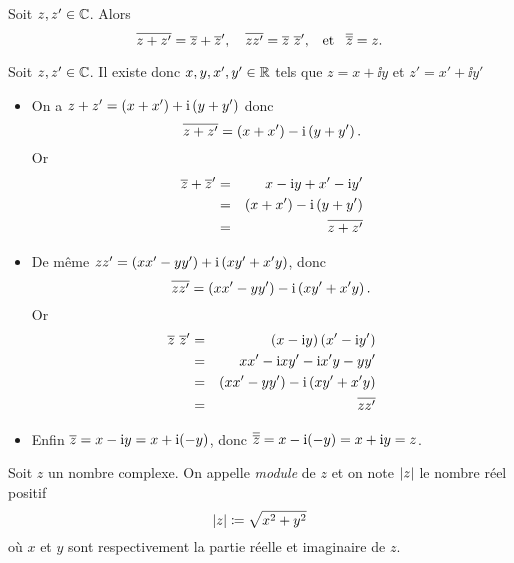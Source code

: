 \documentclass{magnolia}
\begin{document}
\begin{proposition}[utile=-3]
  Soit $z,z'\in\mathbb{C}$. Alors
 \[\overline{z+z'}=\overline{z}+\overline{z}', \quad \overline{z z'}=\overline{z}\ \overline{z}', \quad\!\text{et}\quad\! \overline{\overline{z}}=z.\]
\end{proposition}
\begin{preuve} Soit $z,z'\in\mathbb{C}$. Il existe donc $x,y,x',y'\in\mathbb{R}$ tels que
    $z=x+\ii y$ et $z'=x'+\ii y'$
  \begin{itemize}
  \item On a $z+z'=\left(x+x'\right)+{\rm i} \left(y+y'\right)$ donc
    \[\overline{z+z'}=\left(x+x'\right)-{\rm i} \left(y+y'\right).\] Or
    \begin{eqnarray*}
    \overline{z}+\overline{z}'
    &=& x-{\rm i} y+x'-{\rm i} y'\\
    &=& \left(x+x'\right)-{\rm i} \left(y+y'\right)\\
    &=& \overline{z+z'}
    \end{eqnarray*}
  \item
    De même $zz'=\left(xx'-yy'\right)+{\rm i} \left(xy'+x'y\right)$, donc
    \[\overline{zz'}=\left(xx'-yy'\right)-{\rm i} \left(xy'+x'y\right).\] Or
    \begin{eqnarray*}
    \overline{z}\ \overline{z}'
    &=& \left(x-{\rm i} y\right)\left(x'-{\rm i} y'\right)\\
    &=& xx'-{\rm i} xy'-{\rm i} x'y-yy'\\
    &=& \left(xx'-yy'\right)-{\rm i} \left(xy'+x'y\right)\\
    &=& \overline{z z'}
    \end{eqnarray*}
  \item Enfin $\overline{z}=x-{\rm i} y=x+{\rm i}(-y)$, donc
    $\overline{\overline{z}}=x-{\rm i}(-y)=x+{\rm i} y=z$.
  \end{itemize}
\end{preuve}

\begin{definition}[utile=-3]
Soit $z$ un nombre complexe. On appelle \emph{module} de $z$ et on note $\left|z\right|$ le nombre réel positif
\[\left|z\right|\coloneqq\sqrt{x^2+y^2}\]
où $x$ et $y$ sont respectivement la partie réelle et imaginaire de $z$.
\end{definition}
\end{document}
